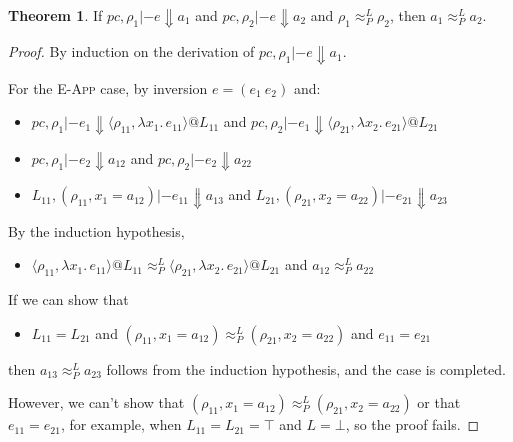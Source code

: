 \documentclass{article}
\makeatletter
\newcommand{\at}{\ensuremath{{\scriptstyle{@}}}}
\newcommand{\pc}{\ensuremath{{\mathit{pc}}}}
\theoremstyle{definition}
\newtheorem{theorem}{Theorem}
\makeatother
\begin{document}
\begin{theorem}
  If $\pc, \rho_1 |- e \Downarrow a_1$ and $\pc, \rho_2 |- e \Downarrow a_2$
  and $\rho_1 \approx^{L}_{P} \rho_2$, then $a_1 \approx^{L}_{P} a_2$.
\end{theorem}
\begin{proof}
  By induction on the derivation of $\pc, \rho_1 |- e \Downarrow a_1$.

    For the \textsc{E-App} case, by inversion $e = (e_1\ e_2)$ and:
    \begin{itemize}
    \item
      $\pc, \rho_1 |- e_1 \Downarrow
      \langle{\rho_{11}, \lambda{x_1}.\, e_{11}\rangle} \at L_{11}$
      \quad and \quad
      $\pc, \rho_2 |- e_1 \Downarrow
      \langle{\rho_{21}, \lambda{x_2}.\, e_{21}\rangle} \at L_{21}$
    \item
      $\pc, \rho_1 |- e_2 \Downarrow a_{12}$
      \hspace{17.2ex} and \quad
      $\pc, \rho_2 |- e_2 \Downarrow a_{22}$
    \item
      $L_{11}, (\rho_{11}, x_1 = a_{12}) |- e_{11} \Downarrow a_{13}$
      \hspace{2.54ex} and \quad
      $L_{21}, (\rho_{21}, x_2 = a_{22}) |- e_{21} \Downarrow a_{23}$
    \end{itemize}
    By the induction hypothesis,
    \begin{itemize}
    \item
      $\langle{\rho_{11}, \lambda{x_1}.\, e_{11}\rangle} \at L_{11}
      \approx^{L}_{P}
      \langle{\rho_{21}, \lambda{x_2}.\, e_{21}\rangle} \at L_{21}$
      \quad and \quad
      $a_{12} \approx^{L}_{P} a_{22}$
    \end{itemize}
    If we can show that
    \begin{itemize}
    \item 
      $L_{11} = L_{21}$
      \quad and \quad
      $(\rho_{11}, x_1 = a_{12}) \approx^{L}_{P} (\rho_{21}, x_2 = a_{22})$
      \quad and \quad
      $e_{11} = e_{21}$
    \end{itemize}
    then $a_{13} \approx^{L}_{P} a_{23}$ follows from the induction hypothesis,
    and the case is completed.
    
    However, we can't show that
    $(\rho_{11}, x_1 = a_{12}) \approx^{L}_{P} (\rho_{21}, x_2 = a_{22})$
    or that
    $e_{11} = e_{21}$, for example, when $L_{11} = L_{21} = \top$ and $L = \bot$,
    so the proof fails.
\end{proof}
\end{document}

